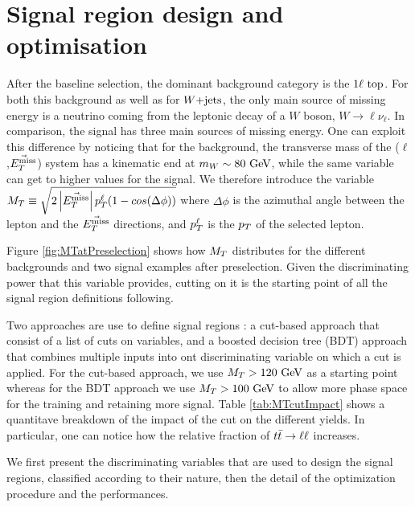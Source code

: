     \section{Signal region design and optimisation \label{sec:analysis_optimization}}

    After the baseline selection, the dominant background category is the $1\ell~\text{top}$.
    For both this background as well as for $\text{$W$+jets}$, the only main source of missing 
    energy is a neutrino coming from the leptonic decay of a $W$ boson, $W \rightarrow 
    \ell \nu_{\ell}$. In comparison, the signal has three main sources of missing energy. 
    One can exploit this difference by noticing
    that for the background, the transverse mass of the ($\ell$,$\vec{E_T^\text{miss}}$) system has a kinematic
    end at $m_{W} \sim 80 ~\text{GeV}$, while the same variable can get to higher values for the signal.
    We therefore introduce the variable $M_T \equiv \sqrt{2 \left|\vec{E_T^\text{miss}}\right| p_T^\ell ( 1 - cos( \Delta \phi  ) ) }$
    where $\Delta \phi$ is the azimuthal angle between the lepton and the $\vec{E_T^\text{miss}}$ directions, and
    $p_T^\ell$ is the $p_T$ of the selected lepton.

    Figure \ref{fig:MTatPreselection} shows how $M_T$ distributes for the different backgrounds and
    two signal examples after preselection. Given the discriminating power that this variable provides,
    cutting on it is the starting point of all the signal region definitions following. 
    

    Two approaches are use to define signal regions : a cut-based approach that consist of a list
    of cuts on variables, and a boosted decision tree (BDT) approach that combines multiple inputs into
    ont discriminating variable on which a cut is applied. For the cut-based approach, we use $M_T > 120 ~\text{GeV}$
    as a starting point whereas for the BDT approach we use $M_T > 100 ~\text{GeV}$ to allow more 
    phase space for the training and retaining more signal. Table \ref{tab:MTcutImpact} 
    shows a quantitave breakdown of the impact of the cut on the different yields. In 
    particular, one can notice how the relative fraction of $t\bar{t} \rightarrow \ell \ell$ increases.
    

    We first present the discriminating variables that are used to design the signal regions, classified
    according to their nature, then the detail of the optimization procedure and the performances.


